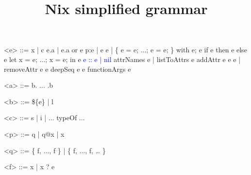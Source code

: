\documentclass{article}
\title{Nix simplified grammar}
\date{}
\begin{document}
\maketitle{}

\begin{grammar}
<e> ::=
    x | c
  \alt e.a | e.a or e
  \alt p:e | e e
  \alt [ e ... e ] | \{ e = e; ...; e = e; \}
  \alt with e; e
  \alt if e then e else e
  \alt let x = e; ...; x = e; in e
  \textcolor{blue}{\alt e :: e | nil}
  \alt attrNames e | listToAttrs e
  \alt addAttr e e e | removeAttr e e
  \alt deepSeq e e
  \alt functionArgs e

<a> ::= b. ... .b

<b> ::= \$\{e\} | l

<c> ::= s | i | ...
  \alt typeOf
  \alt ...

<p> ::= q | q@x | x

<q> ::= \{ f, ..., f \} | \{ f, ..., f, … \}

<f> ::= x | x ? e

\end{grammar}
\end{document}
